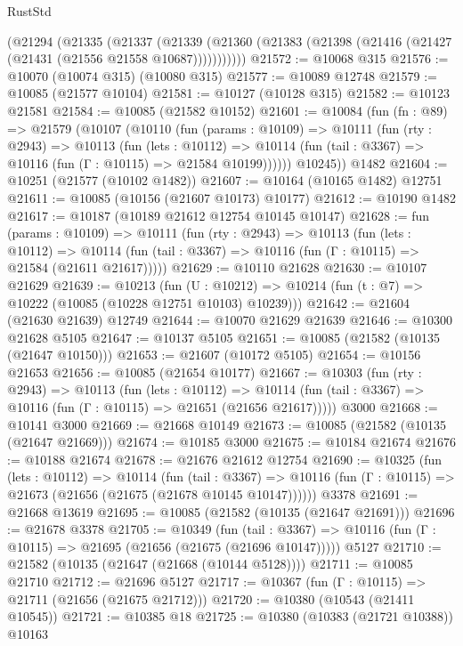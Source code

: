 \begin{lexlean}{RustStd}
\begin{coremodule}
    (@21294
      (@21335
        (@21337
          (@21339 (@21360 (@21383 (@21398 (@21416 (@21427 (@21431 (@21556 @21558 @10687)))))))))))
@21572 := @10068 @315
@21576 := @10070 (@10074 @315) (@10080 @315)
@21577 := @10089 @12748
@21579 := @10085 (@21577 @10104)
@21581 := @10127 (@10128 @315)
@21582 := @10123 @21581
@21584 := @10085 (@21582 @10152)
@21601 := @10084
    (fun (fn : @89) =>
    @21579
      (@10107
        (@10110
          (fun (params : @10109) =>
          @10111
            (fun (rty : @2943) =>
            @10113
              (fun (lets : @10112) =>
              @10114 (fun (tail : @3367) => @10116 (fun (Γ : @10115) => @21584 @10199))))))
        @10245))
    @1482
@21604 := @10251 (@21577 (@10102 @1482))
@21607 := @10164 (@10165 @1482) @12751
@21611 := @10085 (@10156 (@21607 @10173) @10177)
@21612 := @10190 @1482
@21617 := @10187 (@10189 @21612 @12754 @10145 @10147)
@21628 := fun (params : @10109) =>
  @10111
    (fun (rty : @2943) =>
    @10113
      (fun (lets : @10112) =>
      @10114 (fun (tail : @3367) => @10116 (fun (Γ : @10115) => @21584 (@21611 @21617)))))
@21629 := @10110 @21628
@21630 := @10107 @21629
@21639 := @10213
    (fun (U : @10212) => @10214 (fun (t : @7) => @10222 (@10085 (@10228 @12751 @10103) @10239)))
@21642 := @21604 (@21630 @21639) @12749
@21644 := @10070 @21629 @21639
@21646 := @10300 @21628 @5105
@21647 := @10137 @5105
@21651 := @10085 (@21582 (@10135 (@21647 @10150)))
@21653 := @21607 (@10172 @5105)
@21654 := @10156 @21653
@21656 := @10085 (@21654 @10177)
@21667 := @10303
    (fun (rty : @2943) =>
    @10113
      (fun (lets : @10112) =>
      @10114 (fun (tail : @3367) => @10116 (fun (Γ : @10115) => @21651 (@21656 @21617)))))
    @3000
@21668 := @10141 @3000
@21669 := @21668 @10149
@21673 := @10085 (@21582 (@10135 (@21647 @21669)))
@21674 := @10185 @3000
@21675 := @10184 @21674
@21676 := @10188 @21674
@21678 := @21676 @21612 @12754
@21690 := @10325
    (fun (lets : @10112) =>
    @10114
      (fun (tail : @3367) =>
      @10116 (fun (Γ : @10115) => @21673 (@21656 (@21675 (@21678 @10145 @10147))))))
    @3378
@21691 := @21668 @13619
@21695 := @10085 (@21582 (@10135 (@21647 @21691)))
@21696 := @21678 @3378
@21705 := @10349
    (fun (tail : @3367) => @10116 (fun (Γ : @10115) => @21695 (@21656 (@21675 (@21696 @10147)))))
    @5127
@21710 := @21582 (@10135 (@21647 (@21668 (@10144 @5128))))
@21711 := @10085 @21710
@21712 := @21696 @5127
@21717 := @10367 (fun (Γ : @10115) => @21711 (@21656 (@21675 @21712)))
@21720 := @10380 (@10543 (@21411 @10545))
@21721 := @10385 @18
@21725 := @10380 (@10383 (@21721 @10388)) @10163

\end{coremodule}
\end{lexlean}
